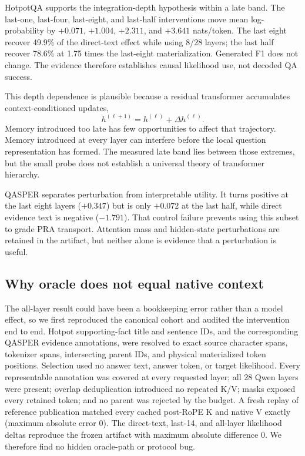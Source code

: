 \documentclass[11pt]{article}
\begin{document}
HotpotQA supports the integration-depth hypothesis within a late band. The last-one, last-four,
last-eight, and last-half interventions move mean log-probability by $+0.071$, $+1.004$,
$+2.311$, and $+3.641$ nats/token. The last eight recover 49.9\% of the direct-text effect while
using 8/28 layers; the last half recover 78.6\% at 1.75 times the last-eight materialization.
Generated F1 does not change. The evidence therefore establishes causal likelihood use, not
decoded QA success.

This depth dependence is plausible because a residual transformer accumulates
context-conditioned updates,
\begin{equation}
  h^{(\ell+1)}=h^{(\ell)}+\Delta h^{(\ell)}.
\end{equation}
Memory introduced too late has few opportunities to affect that trajectory. Memory introduced
at every layer can interfere before the local question representation has formed. The measured
late band lies between those extremes, but the small probe does not establish a universal theory
of transformer hierarchy.

QASPER separates perturbation from interpretable utility. It turns positive at the last eight
layers ($+0.347$) but is only $+0.072$ at the last half, while direct evidence text is negative
($-1.791$). That control failure prevents using this subset to grade PRA transport. Attention
mass and hidden-state perturbations are retained in the artifact, but neither alone is evidence
that a perturbation is useful.

\subsection{Why oracle does not equal native context}
\label{sec:oracle-gap-audit}

The all-layer result could have been a bookkeeping error rather than a model effect, so we first
reproduced the canonical cohort and audited the intervention end to end. Hotpot supporting-fact
title and sentence IDs, and the corresponding QASPER evidence annotations, were resolved to exact
source character spans, tokenizer spans, intersecting parent IDs, and physical materialized token
positions. Selection used no answer text, answer token, or target likelihood. Every representable
annotation was covered at every requested layer; all 28 Qwen layers were present; overlap
deduplication introduced no repeated K/V; masks exposed every retained token; and no parent was
rejected by the budget. A fresh replay of reference publication matched every cached post-RoPE K
and native V exactly (maximum absolute error 0). The direct-text, last-14, and all-layer likelihood
deltas reproduce the frozen artifact with maximum absolute difference 0. We therefore find no
hidden oracle-path or protocol bug.
\end{document}
